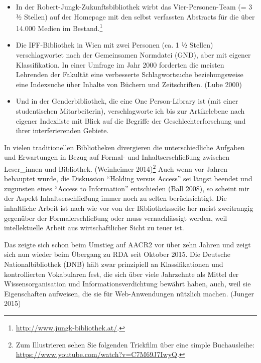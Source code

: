 \begin{itemize}
\item
  In der Robert-Jungk-Zukunftsbibliothek wirbt das Vier-Personen-Team (=
  3 ½ Stellen) auf der Homepage mit den selbst verfassten Abstracts für
  die über 14.000 Medien im Bestand.\footnote{\url{http://www.jungk-bibliothek.at/}.}
\item
  Die IFF-Bibliothek in Wien mit zwei Personen (ca. 1 ½ Stellen)
  verschlagwortet nach der Gemeinsamen Normdatei (GND), aber mit eigener
  Klassifikation. In einer Umfrage im Jahr 2000 forderten die meisten
  Lehrenden der Fakultät eine verbesserte Schlagwortsuche
  beziehungsweise eine Indexsuche über Inhalte von Büchern und
  Zeitschriften. (Lube 2000)
\item
  Und in der Genderbibliothek, die eine One Person-Library ist (mit
  einer studentischen Mitarbeiterin), verschlagworte ich bis zur
  Artikelebene nach eigener Indexliste mit Blick auf die Begriffe der
  Geschlechterforschung und ihrer interferierenden Gebiete.
\end{itemize}

In vielen traditionellen Bibliotheken divergieren die unterschiedliche
Aufgaben und Erwartungen in Bezug auf Formal- und Inhaltserschließung
zwischen Leser\_innen und Bibliothek. (Weinheimer 2014)\footnote{Zum
  Illustrieren sehen Sie folgenden Trickfilm über eine simple
  Buchausleihe: \url{https://www.youtube.com/watch?v=C7M69J7IwyQ}.} Auch
wenn vor Jahren behauptet wurde, die Diskussion \enquote{Holding versus
Access} sei längst beendet und zugunsten eines \enquote{Access to
Information} entschieden (Ball 2008), so scheint mir der Aspekt
Inhaltserschließung immer noch zu selten berücksichtigt. Die inhaltliche
Arbeit ist nach wie vor von der Bibliotheksseite her meist zweitrangig
gegenüber der Formalerschließung oder muss vernachlässigt werden, weil
intellektuelle Arbeit aus wirtschaftlicher Sicht zu teuer ist.

Das zeigte sich schon beim Umstieg auf AACR2 vor über zehn Jahren und
zeigt sich nun wieder beim Übergang zu RDA seit Oktober 2015. Die
Deutsche Nationalbibliothek (DNB) hält zwar prinzipiell an
Klassifikationen und kontrollierten Vokabularen fest, die sich über
viele Jahrzehnte als Mittel der Wissensorganisation und
Informationsverdichtung bewährt haben, auch, weil sie Eigenschaften
aufweisen, die sie für Web-Anwendungen nützlich machen. (Junger 2015)

